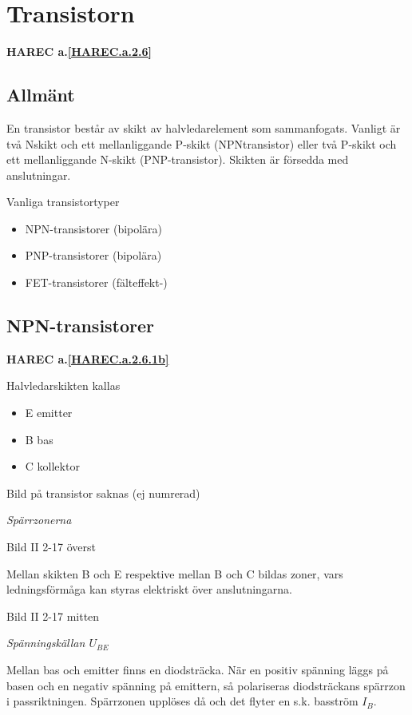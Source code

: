 \section{Transistorn}
\textbf{HAREC a.\ref{HAREC.a.2.6}\label{myHAREC.a.2.6}}

\subsection{Allmänt}

En transistor består av skikt av halvledarelement som sammanfogats. Vanligt är
två Nskikt och ett mellanliggande P-skikt (NPNtransistor) eller två P-skikt och
ett mellanliggande N-skikt (PNP-transistor). Skikten är försedda med
anslutningar.

Vanliga transistortyper
\begin{itemize}
\item NPN-transistorer (bipolära)
\item PNP-transistorer (bipolära)
\item FET-transistorer (fälteffekt-)
\end{itemize}

\subsection{NPN-transistorer}
\textbf{HAREC a.\ref{HAREC.a.2.6.1b}\label{myHAREC.a.2.6.1b}}

Halvledarskikten kallas
\begin{itemize}
\item E emitter
\item B bas
\item C kollektor
\end{itemize}

Bild på transistor saknas (ej numrerad)

\emph{Spärrzonerna}

Bild II 2-17 överst

Mellan skikten B och E respektive mellan B och C bildas zoner, vars
ledningsförmåga kan styras elektriskt över anslutningarna.

Bild II 2-17 mitten

\emph{Spänningskällan \(U_{BE}\)}

Mellan bas och emitter finns en diodsträcka. När en positiv spänning läggs på
basen och en negativ spänning på emittern, så polariseras diodsträckans spärrzon
i passriktningen. Spärrzonen upplöses då och det flyter en s.k. basström
\(I_B\).


